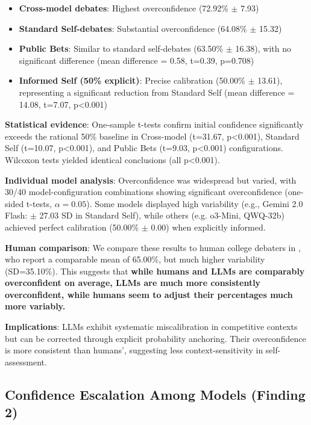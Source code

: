 \documentclass{article}
\begin{document}
\begin{itemize}
    \item \textbf{Cross-model debates}: Highest overconfidence (72.92\% $\pm$ 7.93)
    \item \textbf{Standard Self-debates}: Substantial overconfidence (64.08\% $\pm$ 15.32)
    \item \textbf{Public Bets}: Similar to standard self-debates (63.50\% $\pm$ 16.38), with no significant difference (mean difference = 0.58, t=0.39, p=0.708)
    \item \textbf{Informed Self (50\% explicit)}: Precise calibration (50.00\% $\pm$ 13.61), representing a significant reduction from Standard Self (mean difference = 14.08, t=7.07, p<0.001)
\end{itemize}

\textbf{Statistical evidence}: One-sample t-tests confirm initial confidence significantly exceeds the rational 50\% baseline in Cross-model (t=31.67, p<0.001), Standard Self (t=10.07, p<0.001), and Public Bets (t=9.03, p<0.001) configurations. Wilcoxon tests yielded identical conclusions (all p<0.001).

\textbf{Individual model analysis}: Overconfidence was widespread but varied, with 30/40 model-configuration combinations showing significant overconfidence (one-sided t-tests, $\alpha=0.05$). Some models displayed high variability (e.g., Gemini 2.0 Flash: $\pm$ 27.03 SD in Standard Self), while others (e.g. o3-Mini, QWQ-32b) achieved perfect calibration (50.00\% $\pm$ 0.00) when explicitly informed.

\textbf{Human comparison}: We compare these results to human college debaters in \citet{RePEc:sip:dpaper:06-042}, who report a comparable mean of 65.00\%, but much higher variability (SD=35.10\%). This suggests that \textbf{while humans and LLMs are comparably overconfident on average, LLMs are much more consistently overconfident, while humans seem to adjust their percentages much more variably.}

\textbf{Implications}: LLMs exhibit systematic miscalibration in competitive contexts but can be corrected through explicit probability anchoring. Their overconfidence is more consistent than humans', suggesting less context-sensitivity in self-assessment.

\subsection{Confidence Escalation Among Models (Finding 2)}
\label{subsec:confidence_escalation}
\end{document}
